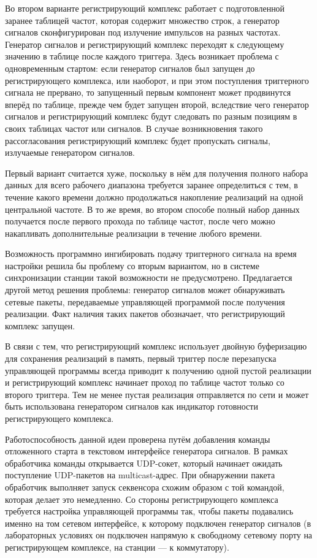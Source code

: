 \documentclass{report}
\begin{document}
Во втором варианте регистрирующий комплекс работает с подготовленной заранее таблицей частот, которая содержит множество строк, а генератор сигналов сконфигурирован под излучение импульсов на разных частотах. Генератор сигналов и регистрирующий комплекс переходят к следующему значению в таблице после каждого триггера. Здесь возникает проблема с одновременным стартом: если генератор сигналов был запущен до регистрирующего комплекса, или наоборот, и при этом поступления триггерного сигнала не прервано, то запущенный первым компонент может продвинутся вперёд по таблице, прежде чем будет запущен второй, вследствие чего генератор сигналов и регистрирующий комплекс будут следовать по разным позициям в своих таблицах частот или сигналов. В случае возникновения такого рассогласования регистрирующий комплекс будет пропускать сигналы, излучаемые генератором сигналов.

Первый вариант считается хуже, поскольку в нём для получения полного набора данных для всего рабочего диапазона требуется заранее определиться с тем, в течение какого времени должно продолжаться накопление реализаций на одной центральной частоте. В то же время, во втором способе полный набор данных получается после первого прохода по таблице частот, после чего можно накапливать дополнительные реализации в течение любого времени.

Возможность программно ингибировать подачу триггерного сигнала на время настройки решила бы проблему со вторым вариантом, но в системе синхронизации станции такой возможности не предусмотрено. Предлагается другой метод решения проблемы: генератор сигналов может обнаруживать сетевые пакеты, передаваемые управляющей программой после получения реализации. Факт наличия таких пакетов обозначает, что регистрирующий комплекс запущен.

В связи с тем, что регистрирующий комплекс использует двойную буферизацию для сохранения реализаций  в память, первый триггер после перезапуска управляющей программы всегда приводит к получению одной пустой реализации и регистрирующий комплекс начинает проход по таблице частот только со второго триггера. Тем не менее пустая реализация отправляется по сети и может быть использована генератором сигналов как индикатор готовности регистрирующего комплекса.

Работоспособность данной идеи проверена путём добавления команды отложенного старта в текстовом интерфейсе генератора сигналов. В рамках обработчика команды открывается UDP-сокет, который начинает ожидать поступление UDP-пакетов на multicast-адрес. При обнаружении пакета обработчик выполняет запуск секвенсора схожим образом с той командой, которая делает это немедленно. Со стороны регистрирующего комплекса требуется настройка управляющей программы так, чтобы пакеты подавались именно на том сетевом интерфейсе, к которому подключен генератор сигналов (в лабораторных условиях он подключен напрямую к свободному сетевому порту на регистрирующем комплексе, на станции --- к коммутатору).
\end{document}
